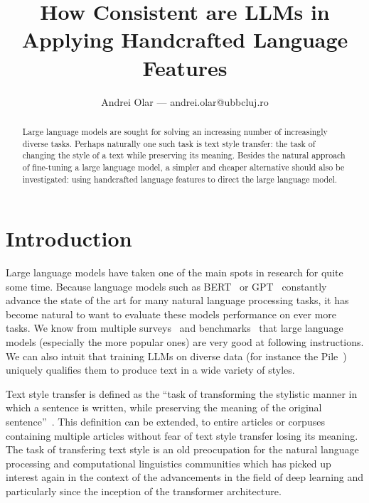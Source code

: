 \documentclass[runningheads,a4paper,11pt]{article}
\begin{document}
\title{How Consistent are LLMs in Applying Handcrafted Language Features}
\author{Andrei Olar --- andrei.olar@ubbcluj.ro}
\maketitle
\begin{abstract}
    Large language models are sought for solving an increasing number of
    increasingly diverse tasks. Perhaps naturally one such task is text style
    transfer: the task of changing the style of a text while preserving its
    meaning. Besides the natural approach of fine-tuning a large language model,
    a simpler and cheaper alternative should also be investigated: using
    handcrafted language features to direct the large language model.
\end{abstract}

\section{Introduction}\label{introduction}

Large language models have taken one of the main spots in research for quite
some time.
Because language models such as BERT~\cite{devlin2018bert} or GPT~\cite{gpt-2018,gpt2-2019,
gpt3-2020} constantly advance the state of the art for many natural language
processing tasks, it has become natural to want to evaluate these models
performance on ever more tasks.
We know from multiple surveys~\cite{minaee2024llmsurvey,zhao2023survey} and
benchmarks~\cite{papcode2024hellaswag,chiang2024chatbot} that large language
models (especially the more popular ones) are very good at following
instructions.
We can also intuit that training LLMs on diverse data (for instance the
Pile~\cite{gao2020pile}) uniquely qualifies them to produce text in a wide
variety of styles.

Text style transfer is defined as the ``task of transforming the stylistic manner
in which a sentence is written, while preserving the meaning of the original
sentence''~\cite{tst-review-2021}.
This definition can be extended, to entire articles or corpuses containing
multiple articles without fear of text style transfer losing its meaning.
The task of transfering text style is an old preocupation for the natural
language processing and computational linguistics communities which has picked
up interest again in the context of the advancements in the field of deep
learning and particularly since the inception of the transformer architecture.
\end{document}
